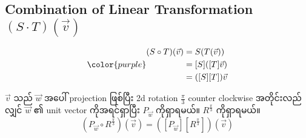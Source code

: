 \subsection{Combination of Linear Transformation $(S\cdot T)(\vec{v})$}
\begin{equation}
    {\color{purple} \begin{split}
        (S\circ T)(\vec{v})&=S(T(\vec{v})) \\
        &=[S]([T]\vec{v}) \\
        &=([S][T])\vec{v}
    \end{split}}
\end{equation}

$\vec{v}$ သည် $\vec{w}$ အပေါ် projection ဖြစ်ပြီး 2d rotation $\frac{\pi}{3}$ counter clockwise အတိုင်းလည်လျှင် $\vec{w}$ ၏ unit vector ကိုအရင်ရှာပြီး $P_{\vec{w}}$ ကိုရှာရမယ်။ $R^{\frac{\pi}{3}}$ ကိုရှာရမယ်။
\[
        (P_{\vec{w}}\circ R^{\frac{\pi}{3}})(\vec{v})=([P_{\vec{w}}][R^{\frac{\pi}{3}}])(\vec{v})
\]